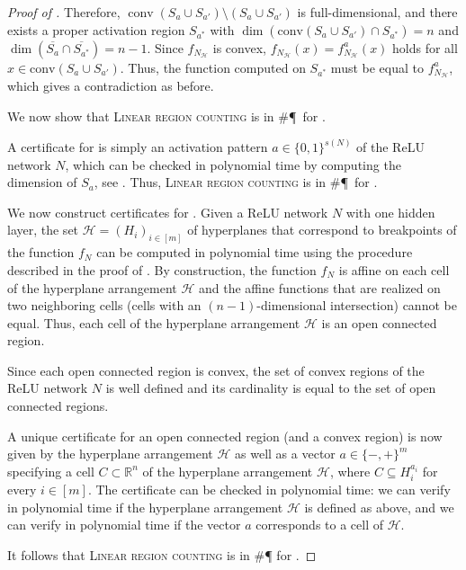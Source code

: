 \documentclass{article}
\DeclareMathOperator{\conv}{conv}
\begin{document}
\begin{proof}[Proof of ]
Therefore, $\conv(S_a \cup S_{a'})\setminus (S_a \cup S_{a'})$ is full-dimensional, and there exists a proper activation region $S_{a^*}$ with $\dim(\text{conv}(S_{a}\cup S_{a'}) \cap S_{a^*})=n$ and $\dim(\overline{S_{a}}\cap \overline{S_{a^*}})=n-1$.
Since $f_{N_\mathcal{H}}$ is convex, $f_{N_\mathcal{H}}(x)=f_{N_\mathcal{H}}^a(x)$ holds for all $x\in \text{conv}(S_{a}\cup S_{a'})$. Thus, the function computed on $S_{a^*}$ must be equal to $f_{N_\mathcal{H}}^a$, which gives a contradiction as before.

We now show that \textsc{Linear region counting} is in \#\P\ for .

A certificate for  is simply an activation pattern $a\in \{0,1\}^{s(N)}$ of the ReLU network $N$, which can be checked in polynomial time by computing the dimension of $S_a$, see .
Thus, \textsc{Linear region counting} is in \#\P\ for .

We now construct certificates for .
Given a ReLU network $N$ with one hidden layer, the set $\mathcal{H}=(H_i)_{i\in[m]}$ of hyperplanes that correspond to breakpoints of the function $f_N$ can be computed in polynomial time using the procedure described in the proof of .
By construction, the function $f_N$ is affine on each cell of the hyperplane arrangement $\mathcal{H}$ and the affine functions that are realized on two neighboring cells (cells with an $(n-1)$-dimensional intersection) cannot be equal.
Thus, each cell of the hyperplane arrangement $\mathcal{H}$ is an open connected region.

Since each open connected region is convex, the set of convex regions of the ReLU network $N$ is well defined and its cardinality is equal to the set of open connected regions.

A unique certificate for an open connected region (and a convex region) is now given by the hyperplane arrangement $\mathcal{H}$ as well as a vector $a\in\{-,+\}^m$ specifying a cell $C\subset\mathbb{R}^n$ of the hyperplane arrangement $\mathcal{H}$, where $C\subseteq H_i^{a_i}$ for every $i\in [m]$.
The certificate can be checked in polynomial time: we can verify in polynomial time if the hyperplane arrangement $\mathcal{H}$ is defined as above, and we can verify in polynomial time if the vector $a$ corresponds to a cell of $\mathcal{H}$.

It follows that \textsc{Linear region counting} is in \#\P{} for .
\end{proof}
\end{document}

